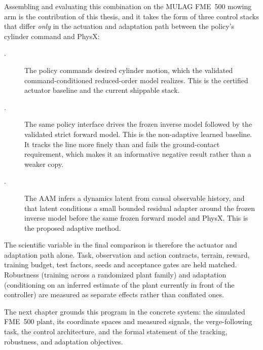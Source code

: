 Assembling and evaluating this combination on the MULAG FME~500
mowing arm is the contribution of this thesis, and it takes the form of
three control stacks that differ \emph{only} in the actuation and
adaptation path between the policy's cylinder command and PhysX:

\begin{description}
  \item[\ppoROM.] The policy commands desired cylinder motion, which the
    validated command-conditioned reduced-order model realizes. This is
    the certified actuator baseline and the current shippable stack.
  \item[\ppoIDFD.] The same policy interface drives the frozen inverse
    model followed by the validated strict forward model. This is the
    non-adaptive learned baseline. It tracks the line more finely than
    \ppoROM{} and fails the ground-contact requirement, which makes it an informative negative result rather than a weaker copy.
  \item[\ppoIDAAMFD.] The AAM infers a dynamics latent from causal
    observable history, and that latent conditions a small bounded
    residual adapter around the frozen inverse model before the same
    frozen forward model and PhysX. This is the proposed adaptive
    method.
\end{description}

The scientific variable in the final comparison is therefore the
actuator and adaptation path alone. Task, observation and action
contracts, terrain, reward, training budget, test factors, seeds and
acceptance gates are held matched. Robustness (training across a
randomized plant family) and adaptation (conditioning on an inferred
estimate of the plant currently in front of the controller) are measured
as separate effects rather than conflated ones.

The next chapter grounds this program in the concrete system: the
simulated FME~500 plant, its coordinate spaces and measured signals, the
verge-following task, the control architecture, and the formal statement
of the tracking, robustness, and adaptation objectives.
